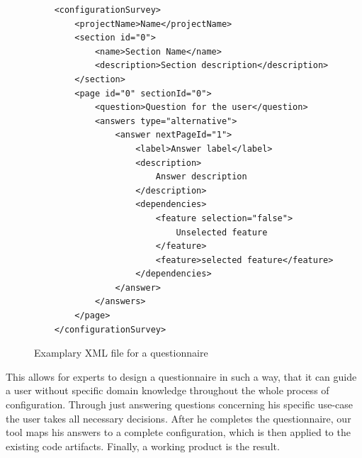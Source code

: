 \begin{figure}[H]
	\lstset{language=XML}
	\begin{lstlisting}
	<configurationSurvey>
		<projectName>Name</projectName>
		<section id="0">
			<name>Section Name</name>
			<description>Section description</description>
		</section>
		<page id="0" sectionId="0">
			<question>Question for the user</question>
			<answers type="alternative">
				<answer nextPageId="1">
					<label>Answer label</label>
					<description>
						Answer description
					</description>
					<dependencies>
						<feature selection="false">
							Unselected feature
						</feature>
						<feature>selected feature</feature>
					</dependencies>
				</answer>
			</answers>
		</page>
	</configurationSurvey>
	\end{lstlisting}
	\caption{Examplary XML file for a  questionnaire}
	\label{fig:xmlFigure}
\end{figure}

This allows for experts to design a questionnaire in such a way, that it can guide a user without specific domain knowledge throughout the whole process of configuration. Through just answering questions concerning his specific use-case the user takes all necessary decisions. After he completes the questionnaire, our tool maps his answers to a complete configuration, which is then applied to the existing code artifacts. Finally, a working product is the result.